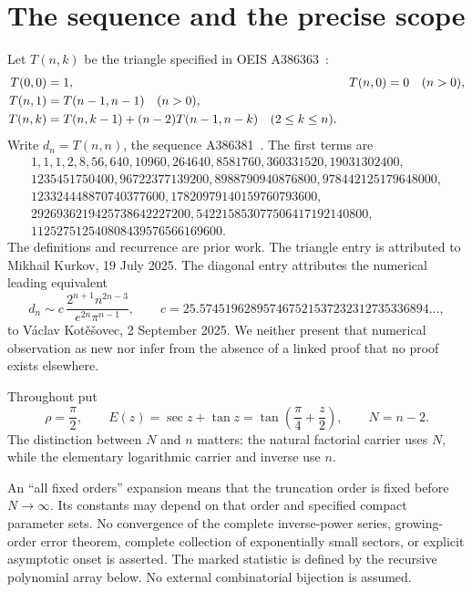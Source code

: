 \documentclass[11pt,letterpaper]{article}
\theoremstyle{remark}\newtheorem{remark}[theorem]{Remark}
\begin{document}
\section{The sequence and the precise scope}\label{men:sec:scope}
Let $T(n,k)$ be the triangle specified in OEIS A386363~\cite{triangle}:
\begin{align}
 T(0,0)&=1,& T(n,0)&=0\quad(n>0),\notag\\
 T(n,1)&=T(n-1,n-1)\quad(n>0),\label{men:eq:triangle}\\
 T(n,k)&=T(n,k-1)+(n-2)T(n-1,n-k)\quad(2\le k\le n).\notag
\end{align}
Write $d_n=T(n,n)$, the sequence A386381~\cite{diagonal}. The first terms are
\[
\begin{gathered}
1,1,1,2,8,56,640,10960,264640,8581760,360331520,19031302400,\\
1235451750400,96722377139200,8988790940876800,978442125179648000,\\
123324448870740377600,17820979140159760793600,\\
2926936219425738642227200,542215853077506417192140800,\\
112527512540808439576566169600.
\end{gathered}
\]
The definitions and recurrence are prior work. The triangle entry is attributed to Mikhail Kurkov, 19 July 2025. The diagonal entry attributes the numerical leading equivalent
\begin{equation}\label{men:eq:oeis}
 d_n\sim c\,\frac{2^{n+1}n^{2n-3}}{e^{2n}\pi^{n-1}},
 \qquad c=25.574519628957467521537232312735336894\ldots,
\end{equation}
to V\'aclav Kot\v e\v sovec, 2 September 2025. We neither present that numerical observation as new nor infer from the absence of a linked proof that no proof exists elsewhere.

Throughout put
\[
 \rho=\frac\pi2,\qquad E(z)=\sec z+\tan z
   =\tan\left(\frac\pi4+\frac z2\right),\qquad N=n-2.
\]
The distinction between $N$ and $n$ matters: the natural factorial carrier uses $N$, while the elementary logarithmic carrier and inverse use $n$.

An ``all fixed orders'' expansion means that the truncation order is fixed before $N\to\infty$. Its constants may depend on that order and specified compact parameter sets. No convergence of the complete inverse-power series, growing-order error theorem, complete collection of exponentially small sectors, or explicit asymptotic onset is asserted. The marked statistic is defined by the recursive polynomial array below. No external combinatorial bijection is assumed.
\end{document}
